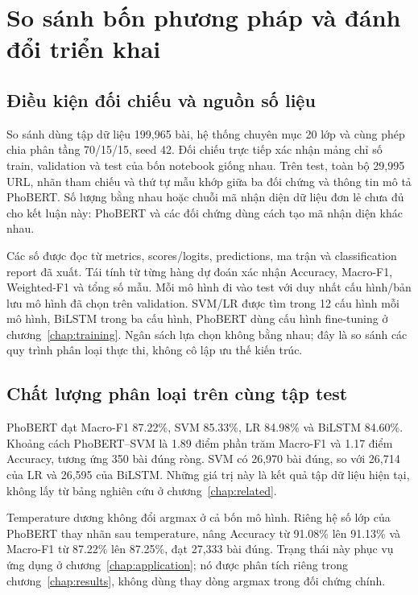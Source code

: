 \chapter{So sánh bốn phương pháp và đánh đổi triển khai}
\label{chap:comparison}
\section{Điều kiện đối chiếu và nguồn số liệu}
So sánh dùng tập dữ liệu 199,965 bài, hệ thống chuyên mục 20 lớp và cùng phép chia phân tầng 70/15/15, seed 42. Đối chiếu trực tiếp xác nhận mảng chỉ số train, validation và test của bốn notebook giống nhau. Trên test, toàn bộ 29,995 URL, nhãn tham chiếu và thứ tự mẫu khớp giữa ba đối chứng và thông tin mô tả PhoBERT. Số lượng bằng nhau hoặc chuỗi mã nhận diện dữ liệu đơn lẻ chưa đủ cho kết luận này: PhoBERT và các đối chứng dùng cách tạo mã nhận diện khác nhau.

Các số được đọc từ metrics, scores/logits, predictions, ma trận và classification report đã xuất. Tái tính từ từng hàng dự đoán xác nhận Accuracy, Macro-F1, Weighted-F1 và tổng số mẫu. Mỗi mô hình đi vào test với duy nhất cấu hình/bản lưu mô hình đã chọn trên validation. SVM/LR được tìm trong 12 cấu hình mỗi mô hình, BiLSTM trong ba cấu hình, PhoBERT dùng cấu hình fine-tuning ở chương~\ref{chap:training}. Ngân sách lựa chọn không bằng nhau; đây là so sánh các quy trình phân loại thực thi, không cô lập ưu thế kiến trúc.

\section{Chất lượng phân loại trên cùng tập test}
PhoBERT đạt Macro-F1 87.22\%, SVM 85.33\%, LR 84.98\% và BiLSTM 84.60\%. Khoảng cách PhoBERT--SVM là 1.89 điểm phần trăm Macro-F1 và 1.17 điểm Accuracy, tương ứng 350 bài đúng ròng. SVM có 26,970 bài đúng, so với 26,714 của LR và 26,595 của BiLSTM. Những giá trị này là kết quả tập dữ liệu hiện tại, không lấy từ bảng nghiên cứu ở chương~\ref{chap:related}.

Temperature dương không đổi argmax ở cả bốn mô hình. Riêng hệ số lớp của PhoBERT thay nhãn sau temperature, nâng Accuracy từ 91.08\% lên 91.13\% và Macro-F1 từ 87.22\% lên 87.25\%, đạt 27,333 bài đúng. Trạng thái này phục vụ ứng dụng ở chương~\ref{chap:application}; nó được phân tích riêng trong chương~\ref{chap:results}, không dùng thay dòng argmax trong đối chứng chính.

